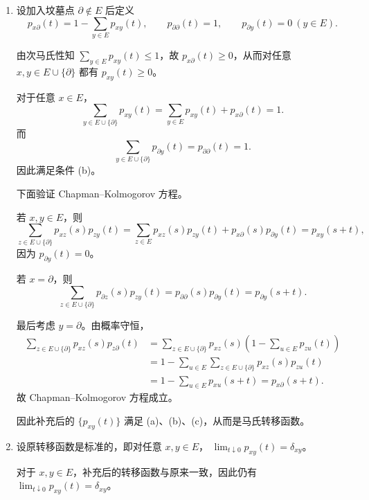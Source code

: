 \documentclass{ctexart}
\begin{document}
\begin{solution}
  \begin{enumerate}
    \item

      设加入坟墓点 $\partial\notin E$ 后定义
      \[
        p_{x\partial}(t)=1-\sum_{y\in E}p_{xy}(t),\qquad
        p_{\partial\partial}(t)=1,\qquad
        p_{\partial y}(t)=0\ (y\in E).
      \]

      由次马氏性知 $\sum_{y\in E}p_{xy}(t)\le 1$，故
      $p_{x\partial}(t)\ge 0$，从而对任意
      $x,y\in E\cup\{\partial\}$ 都有 $p_{xy}(t)\ge 0$。

      对于任意 $x\in E$，
      \[
        \sum_{y\in E\cup\{\partial\}}p_{xy}(t)
        =\sum_{y\in E}p_{xy}(t)+p_{x\partial}(t)=1.
      \]
      而
      \[
        \sum_{y\in E\cup\{\partial\}}p_{\partial y}(t)
        =p_{\partial\partial}(t)=1.
      \]
      因此满足条件 (b)。

      下面验证 Chapman--Kolmogorov 方程。

      若 $x,y\in E$，则
      \[
        \sum_{z\in E\cup\{\partial\}}p_{xz}(s)p_{zy}(t)
        =\sum_{z\in E}p_{xz}(s)p_{zy}(t)
        +p_{x\partial}(s)p_{\partial y}(t)
        =p_{xy}(s+t),
      \]
      因为 $p_{\partial y}(t)=0$。

      若 $x=\partial$，则
      \[
        \sum_{z\in E\cup\{\partial\}}p_{\partial z}(s)p_{zy}(t)
        =p_{\partial\partial}(s)p_{\partial y}(t)
        =p_{\partial y}(s+t).
      \]

      最后考虑 $y=\partial$。由概率守恒，
      \[
        \begin{aligned}
          \sum_{z\in E\cup\{\partial\}}p_{xz}(s)p_{z\partial}(t)
          &=\sum_{z\in E\cup\{\partial\}}p_{xz}(s)
          \left(1-\sum_{u\in E}p_{zu}(t)\right)\\
          &=1-\sum_{u\in E}
          \sum_{z\in E\cup\{\partial\}}p_{xz}(s)p_{zu}(t)\\
          &=1-\sum_{u\in E}p_{xu}(s+t)
          =p_{x\partial}(s+t).
        \end{aligned}
      \]
      故 Chapman--Kolmogorov 方程成立。

      因此补充后的 $\{p_{xy}(t)\}$ 满足 (a)、(b)、(c)，从而是马氏转移函数。

    \item

      设原转移函数是标准的，即对任意 $x,y\in E$，
      $\lim_{t\downarrow0}p_{xy}(t)=\delta_{xy}$。

      对于 $x,y\in E$，补充后的转移函数与原来一致，因此仍有
      $\lim_{t\downarrow0}p_{xy}(t)=\delta_{xy}$。


\end{enumerate}
\end{solution}
\end{document}
